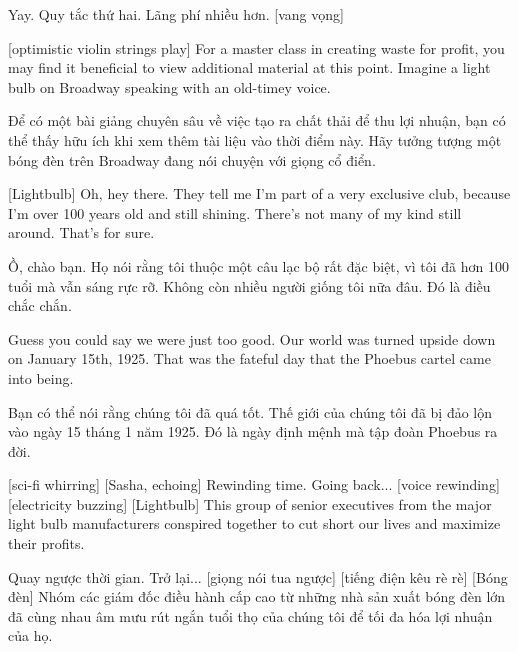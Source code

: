 \documentclass[a4paper]{article}
\begin{document}
	\begin{vietnamese-v2}
		 Yay. 
		Quy tắc thứ hai. 
		Lãng phí nhiều hơn. [vang vọng]
	\end{vietnamese-v2}
	
	[optimistic violin strings play]
	For a master class in creating waste for profit, you may find it beneficial to view additional material at this point.
	Imagine a light bulb on Broadway speaking with an old-timey voice.
	
	\begin{vietnamese-v2}
		Để có một bài giảng chuyên sâu về việc tạo ra chất thải để thu lợi nhuận, bạn có thể thấy hữu ích khi xem thêm tài liệu vào thời điểm này. 
		Hãy tưởng tượng một bóng đèn trên Broadway đang nói chuyện với giọng cổ điển.
	\end{vietnamese-v2}
	
	[Lightbulb] Oh, hey there.
	They tell me I'm part of a very exclusive club, because I'm over 100 years old and still shining.
	There's not many of my kind still around. That's for sure.
	
	\begin{vietnamese-v2}
		 Ồ, chào bạn. 
		Họ nói rằng tôi thuộc một câu lạc bộ rất đặc biệt, vì tôi đã hơn 100 tuổi mà vẫn sáng rực rỡ. 
		Không còn nhiều người giống tôi nữa đâu. Đó là điều chắc chắn.
	\end{vietnamese-v2}
	
	Guess you could say we were just too good.
	Our world was turned upside down on January 15th, 1925.
	That was the fateful day that the Phoebus cartel came into being.
	
	\begin{vietnamese-v2}
		Bạn có thể nói rằng chúng tôi đã quá tốt. 
		Thế giới của chúng tôi đã bị đảo lộn vào ngày 15 tháng 1 năm 1925. 
		Đó là ngày định mệnh mà tập đoàn Phoebus ra đời.
	\end{vietnamese-v2}
	
	[sci-fi whirring]
	[Sasha, echoing] Rewinding time.
	Going back...
	[voice rewinding]
	[electricity buzzing]
	[Lightbulb] This group of senior executives from the major light bulb manufacturers conspired together to cut short our lives and maximize their profits.
	
	\begin{vietnamese-v2}
		 Quay ngược thời gian. Trở lại... [giọng nói tua ngược] [tiếng điện kêu rè rè] [Bóng đèn] Nhóm các giám đốc điều hành cấp cao từ những nhà sản xuất bóng đèn lớn đã cùng nhau âm mưu rút ngắn tuổi thọ của chúng tôi để tối đa hóa lợi nhuận của họ.
	\end{vietnamese-v2}
	
\end{document}
